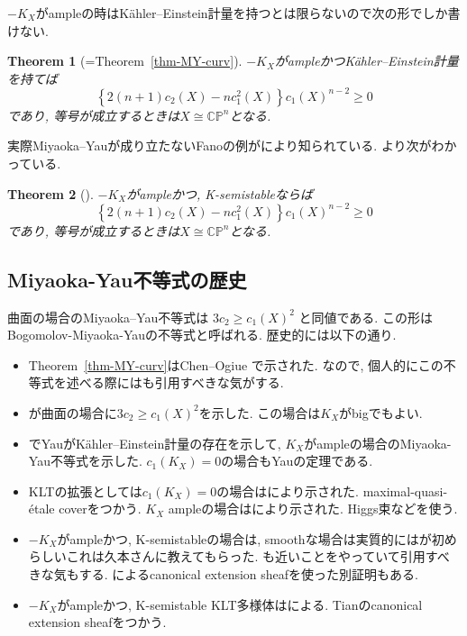 \documentclass[dvipdfmx,a4paper,11pt]{article} %
\newtheorem{thm}{Theorem}[section]
\theoremstyle{definition}
\theoremstyle{remark}
\numberwithin{equation}{section}
\begin{document}
$-K_X$がampleの時はK\"ahler--Einstein計量を持つとは限らないので次の形でしか書けない. 
\begin{thm}[{=Theorem~\ref{thm-MY-curv}}]
$-K_X$がampleかつK\"ahler--Einstein計量を持てば
\[
\left\{
2(n+1)c_2(X)-nc_{1}^{2}(X)
\right\}c_1(X)^{n-2}
\geq 0
\]
であり, 等号が成立するときは$X \cong \mathbb{C}\mathbb{P}^n$となる.
\end{thm}

実際Miyaoka--Yauが成り立たないFanoの例が\cite{GKP22}により知られている. 
\cite{Bando, Tian92, SW16, GKP22, DGP24}より次がわかっている. 

\begin{thm}[{\cite{Bando, Tian92, SW16, GKP22, DGP24}}]
$-K_X$がampleかつ, K-semistableならば
\[
\left\{
2(n+1)c_2(X)-nc_{1}^{2}(X)
\right\}c_1(X)^{n-2}
\geq 0
\]
であり, 等号が成立するときは$X \cong \mathbb{C}\mathbb{P}^n$となる.
\end{thm}


\subsection{Miyaoka-Yau不等式の歴史}
  曲面の場合のMiyaoka--Yau不等式は
\(
3c_2 \geq c_1(X)^2
\)
と同値である. この形はBogomolov-Miyaoka-Yauの不等式と呼ばれる.
歴史的には以下の通り.
\begin{itemize}
\item Theorem~\ref{thm-MY-curv}はChen--Ogiue \cite{CO75}で示された. なので, 個人的にこの不等式を述べる際には\cite{CO75}も引用すべきな気がする. 
\item \cite{Miy77}が曲面の場合に$3c_2 \geq c_1(X)^2$を示した. この場合は$K_X$がbigでもよい. 
\item \cite{Yau77}でYauがK\"ahler--Einstein計量の存在を示して, $K_X$がampleの場合のMiyaoka-Yau不等式を示した. $c_1(K_X)=0$の場合もYauの定理である. 
\item KLTの拡張としては$c_1(K_X)=0$の場合は\cite{GKP16, LT18}により示された. maximal-quasi-\'etale coverをつかう. $K_X$ ampleの場合は\cite{GKPT19a, GKPT19b}により示された. Higgs束などを使う.
\item $-K_X$がampleかつ, K-semistableの場合は, smoothな場合は実質的には\cite{Bando}が初めらしいこれは久本さんに教えてもらった. \cite{SW16}も近いことをやっていて引用すべきな気もする. \cite{Tian92}によるcanonical extension sheafを使った別証明もある. 
\item $-K_X$がampleかつ, K-semistable KLT多様体は\cite{GKP22, DGP24}による. Tianのcanonical extension sheafをつかう. 
\end{itemize}
\end{document}
